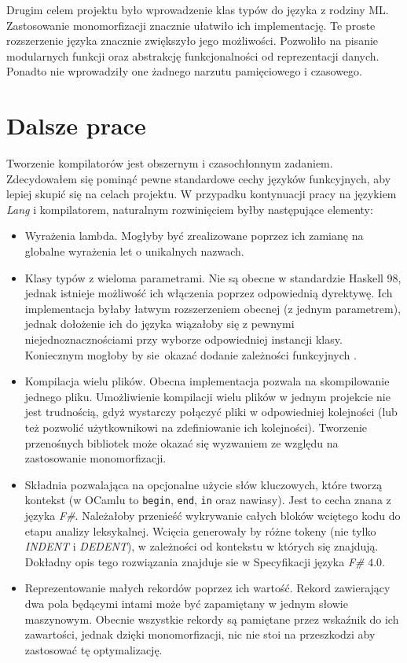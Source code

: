 \documentclass[declaration,shortabstract]{iithesis}
\begin{document}
Drugim celem projektu było wprowadzenie klas typów do języka z rodziny ML. 
Zastosowanie monomorfizacji znacznie ułatwiło ich implementację. Te proste
rozszerzenie języka znacznie zwiększyło jego możliwości. Pozwoliło na 
pisanie modularnych funkcji oraz abstrakcję funkcjonalności od reprezentacji 
danych. Ponadto nie wprowadziły one żadnego narzutu pamięciowego i czasowego.

\section{Dalsze prace}

Tworzenie kompilatorów jest obszernym i czasochłonnym zadaniem. Zdecydowałem 
się pominąć pewne standardowe cechy języków funkcyjnych, aby lepiej skupić 
się na celach projektu. W przypadku kontynuacji pracy na językiem \textit{Lang}
i kompilatorem, naturalnym rozwinięciem byłby następujące elementy:

\begin{itemize}
  \item Wyrażenia lambda. Mogłyby być zrealizowane poprzez ich zamianę na 
  globalne wyrażenia let o unikalnych nazwach. 
  \item Klasy typów z wieloma parametrami. Nie są obecne w standardzie 
  Haskell 98, jednak istnieje możliwość ich włączenia poprzez odpowiednią 
  dyrektywę. Ich implementacja byłaby łatwym 
  rozszerzeniem obecnej (z jednym parametrem), jednak dołożenie ich do języka 
  wiązałoby się z pewnymi niejednoznacznościami \cite{multi_params_tcs}
  przy wyborze odpowiedniej instancji klasy. Koniecznym mogłoby by sie okazać 
  dodanie zależności funkcyjnych \cite{fun_deps}.
  \item Kompilacja wielu plików. Obecna implementacja pozwala na skompilowanie 
  jednego pliku. Umożliwienie kompilacji wielu plików w jednym projekcie nie 
  jest trudnością, gdyż wystarczy połączyć pliki w odpowiedniej kolejności 
  (lub też pozwolić użytkownikowi na zdefiniowanie ich kolejności). Tworzenie 
  przenośnych bibliotek może okazać się wyzwaniem ze względu na zastosowanie 
  monomorfizacji.
  \item Składnia pozwalająca na opcjonalne użycie słów kluczowych, które tworzą 
  kontekst (w OCamlu to \texttt{begin}, \texttt{end}, \texttt{in} oraz nawiasy).
  Jest to cecha znana z języka \textit{F\#}. Należałoby przenieść wykrywanie 
  całych bloków wciętego kodu do etapu analizy leksykalnej. Wcięcia generowały 
  by różne tokeny (nie tylko \textit{INDENT} i \textit{DEDENT}), w zależności 
  od kontekstu w których się znajdują. Dokładny opis tego rozwiązania znajduje 
  sie w Specyfikacji języka \textit{F\#} $4.0$\cite{fs_spec}.
  \item Reprezentowanie małych rekordów poprzez ich wartość. Rekord zawierający 
  dwa pola będącymi intami może być zapamiętany w jednym słowie maszynowym. 
  Obecnie wszystkie rekordy są pamiętane przez wskaźnik do ich zawartości, 
  jednak dzięki monomorfizacji, nic nie stoi na przeszkodzi aby zastosować tę 
  optymalizację.

\end{itemize}
\end{document}

